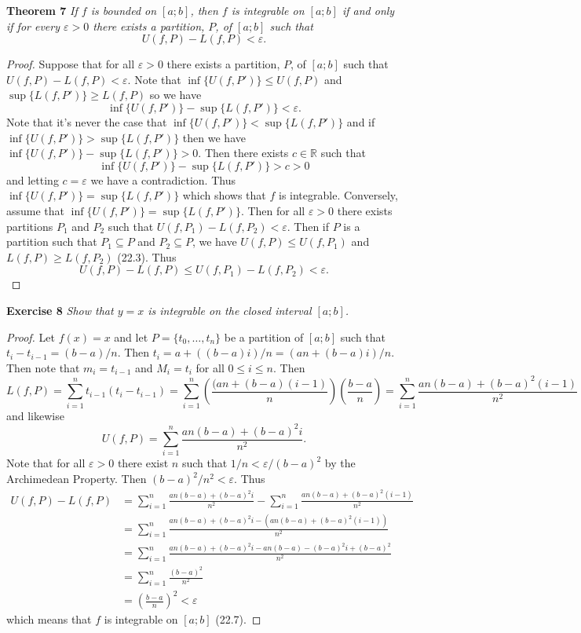 \documentclass{article}
\begin{document}
\begin{flushleft}
\textbf{Theorem 7}
\textsl{If $f$ is bounded on $[a;b]$, then $f$ is integrable on $[a;b]$ if and only if for every $\varepsilon > 0$ there exists a partition, $P$, of $[a;b]$ such that
\[
U(f,P) - L(f,P) < \varepsilon.
\]}
\begin{proof}
Suppose that for all $\varepsilon > 0$ there exists a partition, $P$, of $[a;b]$ such that $U(f,P) - L(f,P) < \varepsilon$. Note that $\inf \{U(f,P')\} \leq U(f,P)$ and $\sup \{L(f,P')\} \geq L(f,P)$ so we have
\[
\inf \{U(f,P')\} - \sup \{L(f,P')\} < \varepsilon.
\]
Note that it's never the case that $\inf \{U(f,P')\} < \sup \{L(f,P')\}$ and if $\inf \{U(f,P')\} > \sup \{L(f,P')\}$ then we have $\inf \{U(f,P')\} - \sup \{L(f,P')\} > 0$. Then there exists $c \in \mathbb{R}$ such that
\[
\inf \{U(f,P')\} - \sup \{L(f,P')\} > c > 0
\]
and letting $c = \varepsilon$ we have a contradiction. Thus $\inf \{U(f,P')\} = \sup \{L(f,P')\}$ which shows that $f$ is integrable. Conversely, assume that $\inf \{U(f,P')\} = \sup \{L(f,P')\}$. Then for all $\varepsilon > 0$ there exists partitions $P_1$ and $P_2$ such that $U(f,P_1) - L(f,P_2) < \varepsilon$. Then if $P$ is a partition such that $P_1 \subseteq P$ and $P_2 \subseteq P$, we have $U(f,P) \leq U(f,P_1)$ and $L(f,P) \geq L(f,P_2)$ (22.3). Thus
\[
U(f,P) - L(f,P) \leq U(f,P_1) - L(f,P_2) < \varepsilon.
\]
\end{proof}

\textbf{Exercise 8}
\textsl{Show that $y=x$ is integrable on the closed interval $[a;b]$.}
\begin{proof}
Let $f (x) = x$ and let $P = \{t_0, \dots , t_n\}$ be a partition of $[a;b]$ such that $t_i - t_{i-1} = (b-a)/n$. Then $t_i = a + ((b-a)i)/n = (an + (b-a)i)/n$. Then note that $m_i = t_{i-1}$ and $M_i = t_i$ for all $0 \leq i \leq n$. Then
\[
L(f,P) = \sum_{i=1}^n t_{i-1} (t_i-t_{i-1}) = \sum_{i=1}^n \left ( \frac{(an + (b-a)(i-1)}{n} \right ) \left ( \frac{b-a}{n} \right ) = \sum_{i=1}^n \frac{an(b-a) + (b-a)^2 (i-1)}{n^2}
\]
and likewise
\[
U(f,P) = \sum_{i=1}^n \frac{an(b-a) + (b-a)^2 i}{n^2}.
\]
Note that for all $\varepsilon > 0$ there exist $n$ such that $1/n < \varepsilon/(b-a)^2$ by the Archimedean Property. Then $(b-a)^2/n^2 < \varepsilon$. Thus
\begin{align*}
U(f,P) - L(f,P) &= \sum_{i=1}^n \frac{an(b-a) + (b-a)^2 i}{n^2} - \sum_{i=1}^n \frac{an(b-a) + (b-a)^2 (i-1)}{n^2} \\
	&= \sum_{i=1}^n \frac{an(b-a) + (b-a)^2 i - (an(b-a) + (b-a)^2 (i-1))}{n^2} \\
	&= \sum_{i=1}^n \frac{an(b-a) + (b-a)^2 i - an(b-a) - (b-a)^2 i + (b-a)^2}{n^2} \\
	&= \sum_{i=1}^n \frac{(b-a)^2}{n^2} \\
	&= \left ( \frac{b-a}{n} \right )^2 < \varepsilon
\end{align*}
which means that $f$ is integrable on $[a;b]$ (22.7).
\end{proof}


\end{flushleft}
\end{document}
